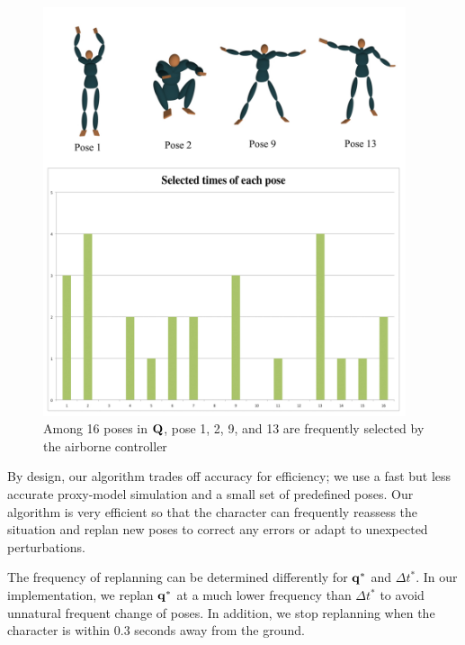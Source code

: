 \begin{figure}[ht]
\center
  \includegraphics[width=4.2in]{images/PoseWithStats}
  \caption{
    Among 16 poses in $\mathbf{Q}$, pose 1, 2, 9, and 13 are frequently 
    selected by the airborne controller
  }
 \label{fig:landing_candidatePoses}
\end{figure}

By design, our algorithm trades off accuracy for efficiency; we use a
fast but less accurate proxy-model simulation and a small set of
predefined poses. Our algorithm is very efficient so that the
character can frequently reassess the situation and replan new poses
to correct any errors or adapt to unexpected perturbations. 

The frequency of replanning can be determined differently for
$\mathbf{q}^*$ and $\Delta t^*$. In our implementation, we replan
$\mathbf{q}^*$ at a much lower frequency than $\Delta t^*$ to avoid
unnatural frequent change of poses. In addition, we stop replanning
when the character is within $0.3$ seconds away from the ground.
